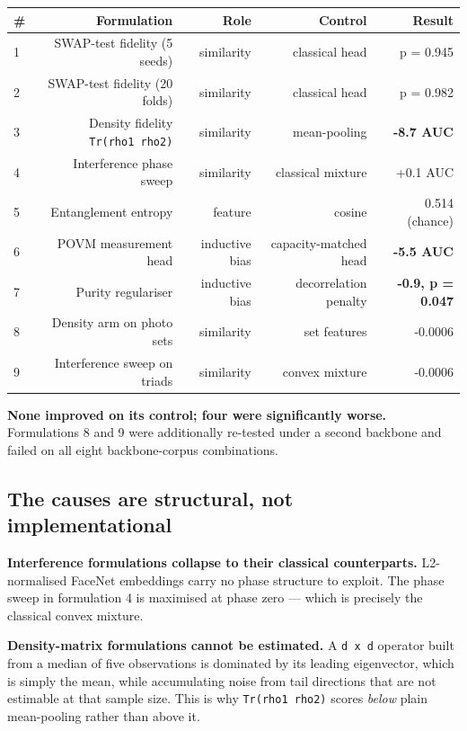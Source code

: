 \documentclass[11pt,a4paper]{article}
\begin{document}
\begin{center}
\small
\begin{tabular}{lrrrr}
\toprule
\# & Formulation & Role & Control & Result \\
\midrule
1 & SWAP-test fidelity (5 seeds) & similarity & classical head & p = 0.945 \\
2 & SWAP-test fidelity (20 folds) & similarity & classical head & p = 0.982 \\
3 & Density fidelity \texttt{Tr(rho1~rho2)} & similarity & mean-pooling & \textbf{-8.7 AUC} \\
4 & Interference phase sweep & similarity & classical mixture & +0.1 AUC \\
5 & Entanglement entropy & feature & cosine & 0.514 (chance) \\
6 & POVM measurement head & inductive bias & capacity-matched head & \textbf{-5.5 AUC} \\
7 & Purity regulariser & inductive bias & decorrelation penalty & \textbf{-0.9, p = 0.047} \\
8 & Density arm on photo sets & similarity & set features & -0.0006 \\
9 & Interference sweep on triads & similarity & convex mixture & -0.0006 \\
\bottomrule
\end{tabular}
\end{center}


\textbf{None improved on its control; four were significantly worse.} Formulations
8 and 9 were additionally re-tested under a second backbone and failed on all
eight backbone-corpus combinations.

\subsection*{The causes are structural, not implementational}

\textbf{Interference formulations collapse to their classical counterparts.}
L2-normalised FaceNet embeddings carry no phase structure to exploit. The phase
sweep in formulation 4 is maximised at phase zero — which is precisely the
classical convex mixture.

\textbf{Density-matrix formulations cannot be estimated.} A \texttt{d~x~d} operator built
from a median of five observations is dominated by its leading eigenvector,
which is simply the mean, while accumulating noise from tail directions that
are not estimable at that sample size. This is why \texttt{Tr(rho1~rho2)} scores
\emph{below} plain mean-pooling rather than above it.
\end{document}

